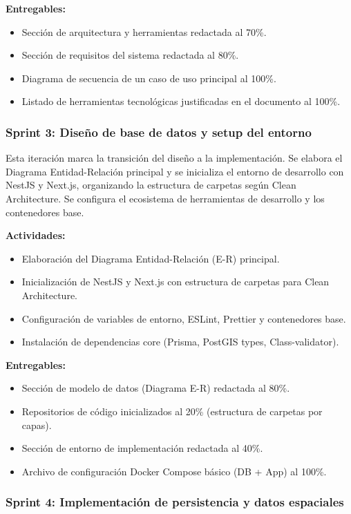\textbf{Entregables:}
\begin{itemize}
    \item Sección de arquitectura y herramientas redactada al 70\%.
    \item Sección de requisitos del sistema redactada al 80\%.
    \item Diagrama de secuencia de un caso de uso principal al 100\%.
    \item Listado de herramientas tecnológicas justificadas en el documento al 100\%.
\end{itemize}

\subsubsection{Sprint 3: Diseño de base de datos y setup del entorno}

Esta iteración marca la transición del diseño a la implementación. Se elabora el Diagrama Entidad-Relación principal y se inicializa el entorno de desarrollo con NestJS y Next.js, organizando la estructura de carpetas según Clean Architecture. Se configura el ecosistema de herramientas de desarrollo y los contenedores base.

\textbf{Actividades:}
\begin{itemize}
    \item Elaboración del Diagrama Entidad-Relación (E-R) principal.
    \item Inicialización de NestJS y Next.js con estructura de carpetas para Clean Architecture.
    \item Configuración de variables de entorno, ESLint, Prettier y contenedores base.
    \item Instalación de dependencias core (Prisma, PostGIS types, Class-validator).
\end{itemize}

\textbf{Entregables:}
\begin{itemize}
    \item Sección de modelo de datos (Diagrama E-R) redactada al 80\%.
    \item Repositorios de código inicializados al 20\% (estructura de carpetas por capas).
    \item Sección de entorno de implementación redactada al 40\%.
    \item Archivo de configuración Docker Compose básico (DB + App) al 100\%.
\end{itemize}

\subsubsection{Sprint 4: Implementación de persistencia y datos espaciales}

